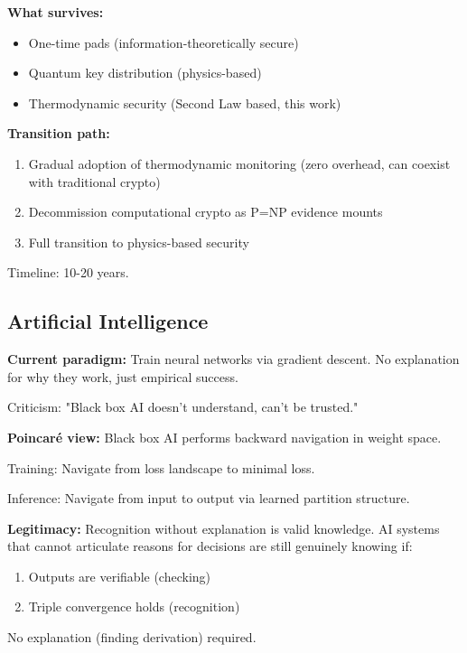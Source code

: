 \documentclass[twocolumn,10pt]{article}
\theoremstyle{definition}
\theoremstyle{remark}
\begin{document}
\textbf{What survives:}
\begin{itemize}
\item One-time pads (information-theoretically secure\cite{shannon1949})
\item Quantum key distribution (physics-based\cite{bennett1984})
\item Thermodynamic security (Second Law based, this work)
\end{itemize}

\vspace{0.2cm}
\noindent\textbf{Transition path:}
\begin{enumerate}
\item Gradual adoption of thermodynamic monitoring (zero overhead, can coexist with traditional crypto)
\item Decommission computational crypto as P=NP evidence mounts
\item Full transition to physics-based security
\end{enumerate}

Timeline: 10-20 years.

\subsection{Artificial Intelligence}

\textbf{Current paradigm:} Train neural networks via gradient descent. No explanation for why they work, just empirical success.

Criticism: "Black box AI doesn't understand, can't be trusted."

\vspace{0.2cm}
\noindent\textbf{Poincaré view:} Black box AI performs backward navigation in weight space.

Training: Navigate from loss landscape to minimal loss.

Inference: Navigate from input to output via learned partition structure.

\vspace{0.2cm}
\noindent\textbf{Legitimacy:} Recognition without explanation is valid knowledge. AI systems that cannot articulate reasons for decisions are still genuinely knowing if:
\begin{enumerate}
\item Outputs are verifiable (checking)
\item Triple convergence holds (recognition)
\end{enumerate}

No explanation (finding derivation) required.
\end{document}
